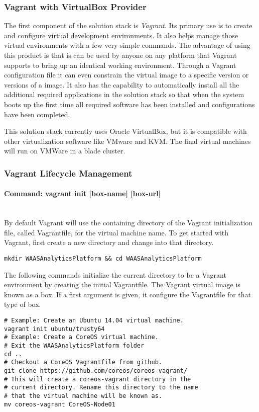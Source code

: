 \subsubsection{Vagrant with VirtualBox Provider}
The first component of the solution stack is \emph{Vagrant}. Its primary use is to create and configure virtual development environments.  It also helps manage those virtual environments with a few very simple commands. The advantage of using this product is that is can be used by anyone on any platform that Vagrant supports to bring up an identical working environment. Through a Vagrant configuration file it can even constrain the virtual image to a specific version or versions of a image. It also has the capability to automatically install all the additional required applications in the solution stack so that when the system boots up the first time all required software has been installed and configurations have been completed.

This solution stack currently uses Oracle VirtualBox, but it is compatible with other virtualization software like VMware and KVM. The final virtual machines will run on VMWare in a blade cluster.

\subsubsection{Vagrant Lifecycle Management}

\paragraph{Command: {\color{red} vagrant init [box-name] [box-url]}} ~\\
By default Vagrant will use the containing directory of the Vagrant initialization file, called Vagrantfile, for the virtual machine name. To get started with Vagrant, first create a new directory and change into that directory.
\begin{lstlisting}
mkdir WAASAnalyticsPlatform && cd WAASAnalyticsPlatform
\end{lstlisting}

The following commands initialize the current directory to be a Vagrant environment by creating the initial Vagrantfile. The Vagrant virtual image is known as a box. If a first argument is given, it configure the Vagrantfile for that type of box.

\begin{lstlisting}
# Example: Create an Ubuntu 14.04 virtual machine.
vagrant init ubuntu/trusty64
# Example: Create a CoreOS virtual machine.
# Exit the WAASAnalyticsPlatform folder
cd ..
# Checkout a CoreOS Vagrantfile from github.
git clone https://github.com/coreos/coreos-vagrant/
# This will create a coreos-vagrant directory in the
# current directory. Rename this directory to the name
# that the virtual machine will be known as.
mv coreos-vagrant CoreOS-Node01
\end{lstlisting}

